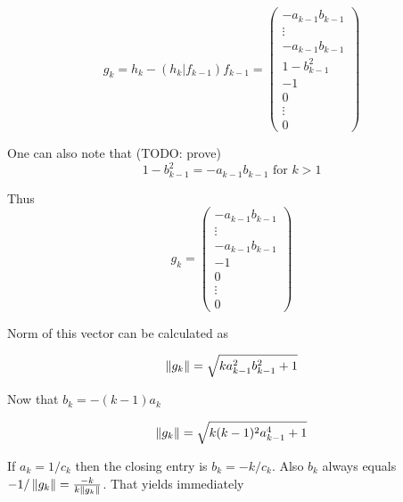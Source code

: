 \documentclass{article}
\begin{document}
\[g_k = h_k - \left(h_k|f_{k-1}\right) f_{k-1} =
\begin{pmatrix}
    - a_{k-1} b_{k-1} \\
    \vdots \\
    - a_{k-1} b_{k-1} \\
    1 - b_{k-1}^2     \\
    -1 \\
    0 \\
    \vdots \\
    0
\end{pmatrix}\]

One can also note that (TODO: prove)
\[1 - b_{k-1}^2 = - a_{k-1} b_{k-1} \text{ for } k>1\]

Thus
\[g_k =
\begin{pmatrix}
    - a_{k-1} b_{k-1} \\
    \vdots \\
    - a_{k-1} b_{k-1} \\
    -1 \\
    0 \\
    \vdots \\
    0
\end{pmatrix}\]

Norm of this vector can be calculated as

\providecommand{\fknorm}{\sqrt{k a_{k-1}^2 b_{k-1}^2 + 1}}
\[\norm{g_k} = \fknorm\]

Now that \( b_k = -(k-1)a_k \)

\renewcommand{\fknorm}{\sqrt{k(k-1)^2 a_{k-1}^4 + 1}}
\[\norm{g_k} = \fknorm\]

If \( a_k = 1/c_k \) then the closing entry is \( b_k = -k/c_k \).
Also \( b_k \) always equals \( -1/\left\|{g_k}\right\| = \frac{-k}{k\left\|{g_k}\right\|} \).
That yields immediately
\end{document}
